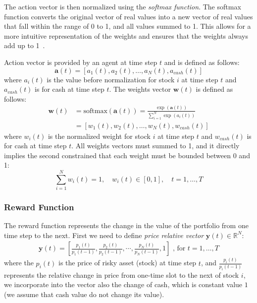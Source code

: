 \documentclass[../xlapes02]{subfiles}
\begin{document}
    The action vector is then normalized using the \emph{softmax function}. The softmax function converts the original vector of real values into a new vector of real values that fall within the range of 0 to 1, and all values summed to 1. This allows for a more intuitive representation of the weights and ensures that the weights always add up to 1~\cite{finrl-portfolio-allocation-2020}.

    Action vector is provided by an agent at time step $t$ and is defined as follows:
    \begin{equation}
        \label{eq:action-vector}
        \bm{a}(t) = [a_1(t), a_2(t), \ldots, a_N(t), a_{cash}(t)]
    \end{equation}
    where $a_i(t)$ is the value before normalization for stock $i$ at time step $t$ and $a_{cash}(t)$ is for cash at time step $t$. The weights vector $\bm{w}(t)$ is defined as follows:
    \begin{equation}
        \label{eq:weights-vector}
        \begin{split}
            \bm{w}(t) &= \text{softmax}(\bm{a}(t)) = \frac{\exp(\bm{a}(t))}{\sum_{i=1}^{N}\exp(a_i(t))} \\
            &= [w_1(t), w_2(t), \ldots, w_N(t), w_{cash}(t)]
        \end{split}
    \end{equation}
    where $w_i(t)$ is the normalized weight for stock $i$ at time step $t$ and $w_{cash}(t)$ is for cash at time step $t$. All weights vectors must summed to 1, and it directly implies the second constrained that each weight must be bounded between 0 and 1:
    \begin{equation}
        \label{eq:equation-constraint}
        \sum_{i=1}^{N}w_i(t)=1,\quad w_i(t)\in[0,1],\quad t=1,\ldots,T
    \end{equation}


    \subsubsection{Reward Function}\label{subsubsec:reward-function}
    The reward function represents the change in the value of the portfolio from one time step to the next. First we need to define \emph{price relative vector} $\bm{y}(t) \in \mathbb{R}^N$:
    \begin{equation}
        \label{eq:price-relative-vector}
        \begin{split}
            \bm{y}(t)=\left[\frac{p_1(t)}{p_1(t-1)}, \frac{p_2(t)}{p_2(t-1)}, \cdots, \frac{p_N(t)}{p_N(t-1)}, 1\right]\text{ , for }t=1,\ldots,T
        \end{split}
    \end{equation}
    where the $p_i(t)$ is the price of risky asset (stock) at time step $t$, and $\frac{p_i(t)}{p_i(t-1)}$ represents the relative change in price from one-time slot to the next of stock $i$, we incorporate into the vector also the change of cash, which is constant value $1$ (we assume that cash value do not change its value).
\end{document}
